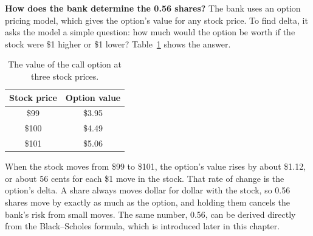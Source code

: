 \textbf{How does the bank determine the 0.56 shares?} The bank uses an option pricing model, which gives the option's value for any stock price. To find delta, it asks the model a simple question: how much would the option be worth if the stock were \$1 higher or \$1 lower? Table~\ref{tab:14-delta} shows the answer.

\begin{table}[htbp]
\centering
\caption{The value of the call option at three stock prices.}
\label{tab:14-delta}
\begin{tabular}{@{}cc@{}}
\toprule
Stock price & Option value \\
\midrule
\$99  & \$3.95 \\
\$100 & \$4.49 \\
\$101 & \$5.06 \\
\bottomrule
\end{tabular}
\end{table}

When the stock moves from \$99 to \$101, the option's value rises by about \$1.12, or about 56 cents for each \$1 move in the stock. That rate of change is the option's delta. A share always moves dollar for dollar with the stock, so 0.56 shares move by exactly as much as the option, and holding them cancels the bank's risk from small moves. The same number, 0.56, can be derived directly from the Black--Scholes formula, which is introduced later in this chapter.

